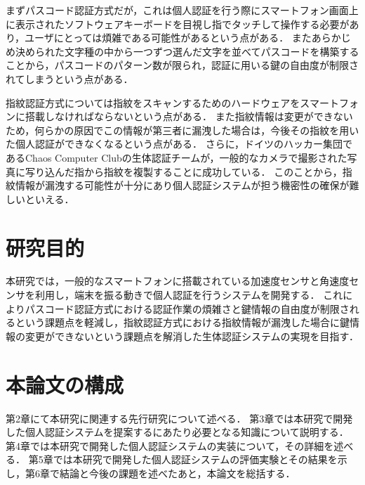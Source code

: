 まずパスコード認証方式だが，これは個人認証を行う際にスマートフォン画面上に表示されたソフトウェアキーボードを目視し指でタッチして操作する必要があり，ユーザにとっては煩雑である可能性があるという点がある．
またあらかじめ決められた文字種の中から一つずつ選んだ文字を並べてパスコードを構築することから，パスコードのパターン数が限られ，認証に用いる鍵の自由度が制限されてしまうという点がある．

指紋認証方式については指紋をスキャンするためのハードウェアをスマートフォンに搭載しなければならないという点がある．
また指紋情報は変更ができないため，何らかの原因でこの情報が第三者に漏洩した場合は，今後その指紋を用いた個人認証ができなくなるという点がある．
さらに，ドイツのハッカー集団であるChaos Computer Clubの生体認証チームが，一般的なカメラで撮影された写真に写り込んだ指から指紋を複製することに成功している\cite{1-ccc}．
このことから，指紋情報が漏洩する可能性が十分にあり個人認証システムが担う機密性の確保が難しいといえる\cite{1-sophos}．

\section{研究目的}
本研究では，一般的なスマートフォンに搭載されている加速度センサと角速度センサを利用し，端末を振る動きで個人認証を行うシステムを開発する．
これによりパスコード認証方式における認証作業の煩雑さと鍵情報の自由度が制限されるという課題点を軽減し，指紋認証方式における指紋情報が漏洩した場合に鍵情報の変更ができないという課題点を解消した生体認証システムの実現を目指す．

\section{本論文の構成}
第2章にて本研究に関連する先行研究について述べる．
第3章では本研究で開発した個人認証システムを提案するにあたり必要となる知識について説明する．
第4章では本研究で開発した個人認証システムの実装について，その詳細を述べる．
第5章では本研究で開発した個人認証システムの評価実験とその結果を示し，第6章で結論と今後の課題を述べたあと，本論文を総括する．
